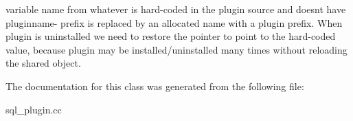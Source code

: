 variable name from whatever is hard-\/coded in the plugin source and doesn\textquotesingle{}t have pluginname-\/ prefix is replaced by an allocated name with a plugin prefix. When plugin is uninstalled we need to restore the pointer to point to the hard-\/coded value, because plugin may be installed/uninstalled many times without reloading the shared object. 

The documentation for this class was generated from the following file\+:\begin{DoxyCompactItemize}
\item 
sql\+\_\+plugin.\+cc\end{DoxyCompactItemize}
